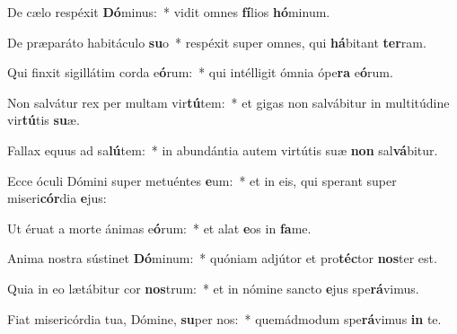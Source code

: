 \item De cælo respéxit \textbf{Dó}minus:~* vidit omnes \textbf{fí}lios \textbf{hó}minum.
\item De præparáto habitáculo \textbf{su}o~* respéxit super omnes, qui \textbf{há}bitant \textbf{ter}ram.
\item Qui finxit sigillátim corda e\textbf{ó}rum:~* qui intélligit ómnia ópe\textbf{ra} e\textbf{ó}rum.
\item Non salvátur rex per multam vir\textbf{tú}tem:~* et gigas non salvábitur in multitúdine vir\textbf{tú}tis \textbf{su}æ.
\item Fallax equus ad sa\textbf{lú}tem:~* in abundántia autem virtútis suæ \textbf{non} sal\textbf{vá}bitur.
\item Ecce óculi Dómini super metuéntes \textbf{e}um:~* et in eis, qui sperant super miseri\textbf{cór}dia \textbf{e}jus:
\item Ut éruat a morte ánimas e\textbf{ó}rum:~* et alat \textbf{e}os in \textbf{fa}me.
\item Anima nostra sústinet \textbf{Dó}minum:~* quóniam adjútor et pro\textbf{téc}tor \textbf{nos}ter est.
\item Quia in eo lætábitur cor \textbf{nos}trum:~* et in nómine sancto \textbf{e}jus spe\textbf{rá}vimus.
\item Fiat misericórdia tua, Dómine, \textbf{su}per nos:~* quemádmodum spe\textbf{rá}vimus \textbf{in} te.

